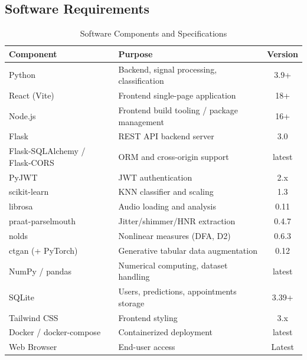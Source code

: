 \documentclass[oneside,a4paper,12pt]{report}
\begin{document}
\subsection{Software Requirements}
\begin{table}[H]
\centering
\caption{Software Components and Specifications}
\label{tab:sw}
\def\arraystretch{1.25}
\begin{tabularx}{\textwidth}{|X|X|c|}
\hline
\textbf{Component} & \textbf{Purpose} & \textbf{Version} \\ \hline
Python & Backend, signal processing, classification & 3.9+ \\ \hline
React (Vite) & Frontend single-page application & 18+ \\ \hline
Node.js & Frontend build tooling / package management & 16+ \\ \hline
Flask & REST API backend server & 3.0 \\ \hline
Flask-SQLAlchemy / Flask-CORS & ORM and cross-origin support & latest \\ \hline
PyJWT & JWT authentication & 2.x \\ \hline
scikit-learn & KNN classifier and scaling & 1.3 \\ \hline
librosa & Audio loading and analysis & 0.11 \\ \hline
praat-parselmouth & Jitter/shimmer/HNR extraction & 0.4.7 \\ \hline
nolds & Nonlinear measures (DFA, D2) & 0.6.3 \\ \hline
ctgan (+ PyTorch) & Generative tabular data augmentation & 0.12 \\ \hline
NumPy / pandas & Numerical computing, dataset handling & latest \\ \hline
SQLite & Users, predictions, appointments storage & 3.39+ \\ \hline
Tailwind CSS & Frontend styling & 3.x \\ \hline
Docker / docker-compose & Containerized deployment & latest \\ \hline
Web Browser & End-user access & Latest \\ \hline
\end{tabularx}
\end{table}
\end{document}
